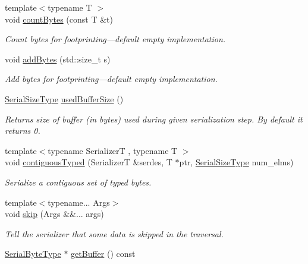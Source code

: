 \begin{DoxyCompactItemize}
{\footnotesize template$<$typename T $>$ }\\void \hyperlink{structcheckpoint_1_1_serializer_a805ae9ce395614512dfb6b0bd2c22881}{count\+Bytes} (const T \&t)
\begin{DoxyCompactList}\small\item\em Count bytes for footprinting---default empty implementation. \end{DoxyCompactList}\item 
void \hyperlink{structcheckpoint_1_1_serializer_a52cd27806c3b821605d723900ec7d2e5}{add\+Bytes} (std\+::size\+\_\+t s)
\begin{DoxyCompactList}\small\item\em Add bytes for footprinting---default empty implementation. \end{DoxyCompactList}\item 
\hyperlink{namespacecheckpoint_a083f6674da3f94c2901b18c6d238217c}{Serial\+Size\+Type} \hyperlink{structcheckpoint_1_1_serializer_a9193aca9404eadbb6617273d0fb1343b}{used\+Buffer\+Size} ()
\begin{DoxyCompactList}\small\item\em Returns size of buffer (in bytes) used during given serialization step. By default it returns 0. \end{DoxyCompactList}\item 
{\footnotesize template$<$typename SerializerT , typename T $>$ }\\void \hyperlink{structcheckpoint_1_1_serializer_af2f453fc63424918a16ea6024d576a3e}{contiguous\+Typed} (SerializerT \&serdes, T $\ast$ptr, \hyperlink{namespacecheckpoint_a083f6674da3f94c2901b18c6d238217c}{Serial\+Size\+Type} num\+\_\+elms)
\begin{DoxyCompactList}\small\item\em Serialize a contiguous set of typed bytes. \end{DoxyCompactList}\item 
{\footnotesize template$<$typename... Args$>$ }\\void \hyperlink{structcheckpoint_1_1_serializer_ae0224c5bad49a1bd2af178987adb84f9}{skip} (Args \&\&... args)
\begin{DoxyCompactList}\small\item\em Tell the serializer that some data is skipped in the traversal. \end{DoxyCompactList}\item 
\hyperlink{namespacecheckpoint_ae57f01cdc0b81776c23b6c7c934c58f5}{Serial\+Byte\+Type} $\ast$ \hyperlink{structcheckpoint_1_1_serializer_a6231bd380e02ee8668e7a6efebca2664}{get\+Buffer} () const

\end{DoxyCompactItemize}
